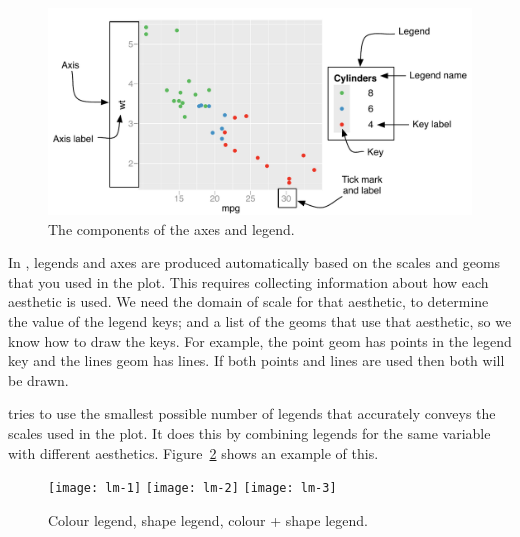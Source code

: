 \begin{figure}[htbp]
  \centering
  \includegraphics[width=\textwidth]{scale-guides}
  
  \caption{The components of the axes and legend.}
  \label{fig:labelled-guides}
\end{figure}

In \ggplot, legends and axes are produced automatically based on the scales and geoms that you used in the plot. This requires collecting information about how each aesthetic is used. We need the domain of scale for that aesthetic, to determine the value of the legend keys; and a list of the geoms that use that aesthetic, so we know how to draw the keys. For example, the point geom has points in the legend key and the lines geom has lines. If both points and lines are used then both will be drawn.

\ggplot tries to use the smallest possible number of legends that accurately conveys the scales used in the plot.  It does this by combining legends for the same variable with different aesthetics.  Figure~\ref{fig:legend-merge} shows an example of this.  


%
% 
\begin{figure}[htbp]
  \centering
  \texttt{[image: lm-1]}%
  \texttt{[image: lm-2]}%
  \texttt{[image: lm-3]}
  
  \caption{Colour legend, shape legend, colour + shape legend. }
  \label{fig:legend-merge}
\end{figure}

